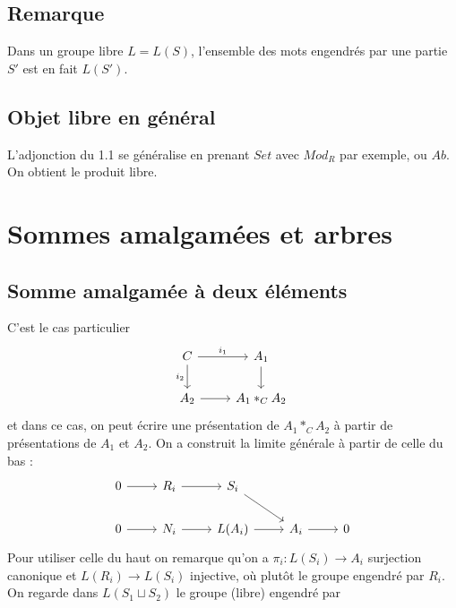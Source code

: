 \documentclass[a4paper,12pt]{book}
\theoremstyle{plain}
\theoremstyle{definition}
\theoremstyle{remark}
\begin{document}
\section{Remarque}
Dans un groupe libre $L=L(S)$, l'ensemble des mots engendrés par
une partie $S'$ est en fait $L(S')$.

\section{Objet libre en général}
L'adjonction du 1.1 se généralise en prenant $Set$ avec
$Mod_R$ par exemple, ou $Ab$. On obtient le produit libre.

\chapter{Sommes amalgamées et arbres}
\section{Somme amalgamée à deux éléments}
C'est le cas particulier
\[\begin{tikzcd}
	C & {A_1} \\
	{A_2} & {A_1*_CA_2}
	\arrow["{i_1}", from=1-1, to=1-2]
	\arrow["{i_2}"', from=1-1, to=2-1]
	\arrow[from=1-2, to=2-2]
	\arrow[from=2-1, to=2-2]
\end{tikzcd}\]
et dans ce cas, on peut écrire une présentation de $A_1*_CA_2$ 
à partir de présentations de $A_1$ et $A_2$. On a construit
la limite générale à partir de celle du bas :
\[\begin{tikzcd}
	0 & {R_i} & {S_i} \\
	0 & {N_i} & {L(A_i)} & {A_i} & 0
	\arrow[from=1-1, to=1-2]
	\arrow[from=1-2, to=1-3]
	\arrow[from=1-3, to=2-4]
	\arrow[from=2-1, to=2-2]
	\arrow[from=2-2, to=2-3]
	\arrow[from=2-3, to=2-4]
	\arrow[from=2-4, to=2-5]
\end{tikzcd}\]
Pour utiliser celle du haut on remarque qu'on a 
$\pi_i\colon L(S_i)\to A_i$
surjection canonique et $L(R_i)\to L(S_i)$ injective, où plutôt le 
groupe engendré par $R_i$. On regarde dans $L(S_1\sqcup S_2)$
le groupe (libre) engendré par 
\end{document}
